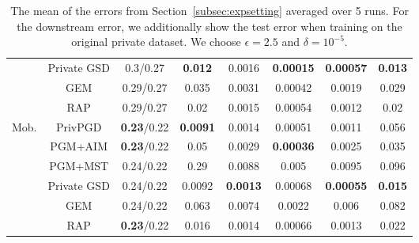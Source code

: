 \begin{table}[ht]
\begin{tabular}{cccccccc}
 & Private GSD&0.3/0.27 & \textbf{0.012} & 0.0016 & \textbf{0.00015} & \textbf{0.00057} & \textbf{0.013} \\
 & GEM&0.29/0.27 & 0.035 & 0.0031 & 0.00042 & 0.0019 & 0.029 \\
 & RAP&0.29/0.27 & 0.02 & 0.0015 & 0.00054 & 0.0012 & 0.02 \\
\midrule \multirow{6}{*}{Mob. } & PrivPGD&\textbf{0.23}/0.22 & \textbf{0.0091} & 0.0014 & 0.00051 & 0.0011 & 0.056 \\
 & PGM+AIM&\textbf{0.23}/0.22 & 0.05 & 0.0029 & \textbf{0.00036} & 0.0025 & 0.035 \\
 & PGM+MST&0.24/0.22 & 0.29 & 0.0088 & 0.005 & 0.0095 & 0.096 \\
 & Private GSD&0.24/0.22 & 0.0092 & \textbf{0.0013} & 0.00068 & \textbf{0.00055} & \textbf{0.015} \\
 & GEM&0.24/0.22 & 0.063 & 0.0074 & 0.0022 & 0.006 & 0.082 \\
 & RAP&\textbf{0.23}/0.22 & 0.016 & 0.0014 & 0.00066 & 0.0013 & 0.022 \\
 \bottomrule
 \end{tabular}
 \caption{
    \small The mean of the errors from Section~\ref{subsec:expsetting}  averaged over 5 runs. For the downstream error, we additionally show the test error when training on the original private dataset. We choose $\epsilon =2.5$ and $\delta = 10^{-5}$.}
    \label{table_1}
 \end{table}
 
